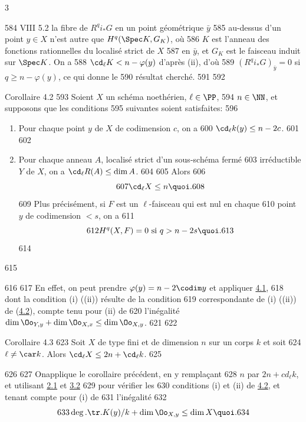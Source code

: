 3	\documentclass[10pt]{../fichiers-configuration-latex/smfart}
\begin{document}
   584	VIII 5.2 la fibre de $R^qi_{\ast}G$ en un point géométrique $\bar{y}$
   585	au-dessus d'un point $y\in X$ n'est autre que $H^q(\Spec K, G_K)$, où
   586	$K$ est l'anneau des fonctions rationnelles du localisé strict de $X$
   587	en $\bar{y}$, et $G_K$ est le faisceau induit sur $\Spec K$. On a
   588	$\cd_{\ell}K<n-\varphi(y)$ d'après (ii), d'où
   589	$(R^qi_{\ast}G)_{\bar{y}}=0$ si $q\geq n-\varphi(y)$, ce qui donne le
   590	résultat cherché.
   591	
   592	\begin{enonce*}{Corollaire 4.2}
   593	Soient $X$ un schéma noethérien, $\ell\in \PP$,
   594	$n\in \NN$, et supposons que les conditions
   595	suivantes soient satisfaites:
   596	\begin{enumerate}
   597	\renewcommand{\theenumi}{\roman{enumi}}
   598	\renewcommand{\labelenumi}{(\theenumi)}
   599	\item Pour chaque point $y$ de $X$ de codimension $c$, on a
   600	  $\cd_{\ell}k(y)\leq n-2c$.
   601	
   602	\item Pour chaque anneau $A$, localisé strict d'un sous-schéma fermé
   603	  irréductible $Y$ de $X$, on a $\cd_{\ell}R(A)\leq \dim A$.
   604	
   605	Alors
   606	$$
   607	\cd_{\ell}X\leq n{\quoi}.
   608	$$
   609	Plus précisément, si $F$ est un $\ell$-faisceau qui est nul en chaque
   610	point $y$ de codimension $<s$, on a
   611	$$
   612	H^q(X,F)=0\mbox{ si } q>n-2s{\quoi}.
   613	$$
   614	\end{enumerate}
   615	\end{enonce*}
   616	
   617	En effet, on peut prendre $\varphi(y)=n-2\codim y$ et appliquer \hyperref[X.thm4.1]{4.1},
   618	dont la condition (i) (\resp (ii)) résulte de la condition
   619	correspondante de (i) (\resp (ii)) de (\hyperref[X.cor4.2]{4.2}), compte tenu pour (ii) de
   620	l'inégalité $\dim \Oo_{Y,y}+\dim \Oo_{X,x}\leq \dim \Oo_{X,y}$.
   621	
   622	\begin{enonce*}{Corollaire 4.3}
   623	Soit $X$ de type fini et de dimension $n$ sur un corps $k$ et soit
   624	$\ell\neq \car k$. Alors $\cd_{\ell}X\leq 2n+\cd_{\ell}k$.
   625	\end{enonce*}
   626	
   627	On\pageoriginale applique le corollaire précédent, en y remplaçant
   628	$n$ par $2n+cd_{\ell}k$, et utilisant \hyperref[X.thm2.1]{2.1} et \hyperref[X.prop3.2]{3.2} 
   629	pour vérifier les
   630	conditions (i) et (ii) de \hyperref[X.cor4.2]{4.2}, et tenant compte pour (i) de
   631	l'inégalité
   632	$$
   633	\deg.\tr.K(y)/k+\dim \Oo_{X,y}\leq \dim X{\quoi}.
   634	$$
\end{document}

